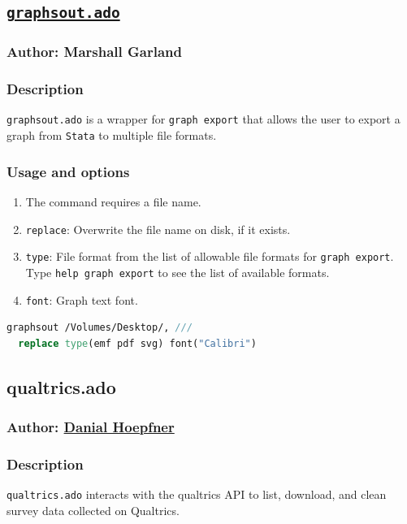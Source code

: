 \documentclass[11pt]{article}
\begin{document}
{\subsection{\href{https://github.com/GibsonConsult/graphsout}{\texttt{graphsout.ado}}}
\subsubsection{Author: Marshall Garland}
\subsubsection{Description}
\texttt{graphsout.ado} is a wrapper for \texttt{graph export} that allows the user to export a graph from \texttt{Stata} to multiple file formats.
\subsubsection{Usage and options}
\begin{enumerate}
\item The command requires a file name.
\item \texttt{replace}: Overwrite the file name on disk, if it exists.
\item \texttt{type}: File format from the list of allowable file formats for \texttt{graph export}. Type \texttt{help graph export} to see the list of available formats.
\item \texttt{font}: Graph text font.
\end{enumerate}
\begin{lstlisting}[language=Stata, numbers=none]
graphsout /Volumes/Desktop/, ///
  replace type(emf pdf svg) font("Calibri")
\end{lstlisting}

\subsection{qualtrics.ado}
\subsubsection{Author: \href{mailto:dhoepfner@gibsonconsult.com}{Danial Hoepfner}}
\subsubsection{Description}
\texttt{qualtrics.ado} interacts with the qualtrics API to list, download, and clean survey data collected on Qualtrics.
}
\end{document}
